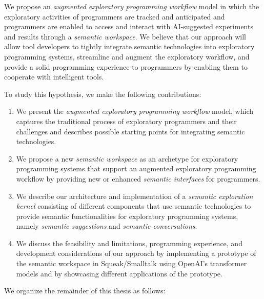 We propose an \emph{augmented exploratory programming workflow} model in which the exploratory activities of programmers are tracked and anticipated and programmers are enabled to access and interact with AI-suggested experiments and results through a \emph{semantic workspace}.
We believe that our approach will allow tool developers to tightly integrate semantic technologies into exploratory programming systems, streamline and augment the exploratory workflow, and provide a solid programming experience to programmers by enabling them to cooperate with intelligent tools.

To study this hypothesis, we make the following contributions:

\begin{enumerate}[label=C\arabic*]
	\item We present the \emph{augmented exploratory programming workflow} model, which captures the traditional process of exploratory programmers and their challenges and describes possible starting points for integrating semantic technologies.
	\item We propose a new \emph{semantic workspace} as an archetype for exploratory programming systems that support an augmented exploratory programming workflow by providing new or enhanced \emph{semantic interfaces} for programmers.
	\item We describe our architecture and implementation of a \emph{semantic exploration kernel} consisting of different components that use semantic technologies to provide semantic functionalities for exploratory programming systems, namely \emph{semantic suggestions} and \emph{semantic conversations}.
	\item We discuss the feasibility and limitations, programming experience, and development considerations of our approach by implementing a prototype of the semantic workspace in Squeak/Smalltalk using OpenAI's transformer models and by showcasing different applications of the prototype.
\end{enumerate}

We organize the remainder of this thesis as follows:

